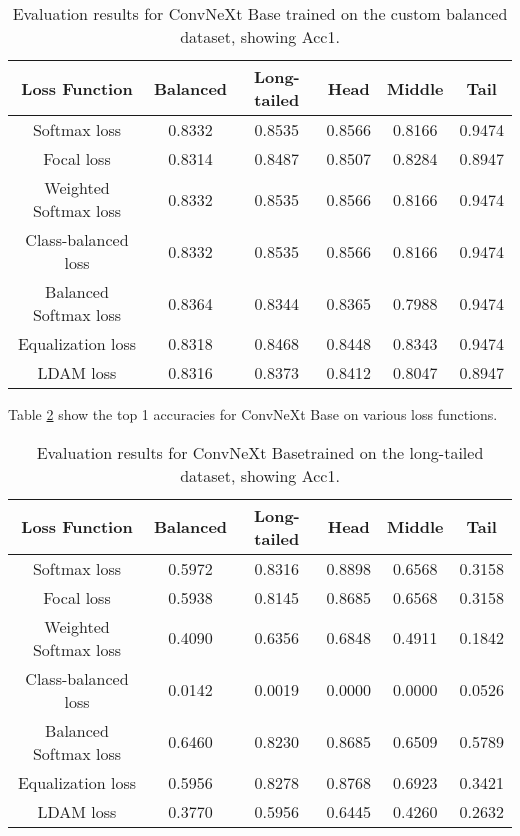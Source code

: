 \begin{table}[h!]
    \centering
    \begin{tabular}{cccccc}
        \toprule
        Loss Function & Balanced & Long-tailed & Head & Middle & Tail \\ 
        \midrule
        Softmax loss   & 0.8332 & 0.8535 & 0.8566 & 0.8166 & 0.9474 \\
        Focal loss   & 0.8314 & 0.8487 & 0.8507 & 0.8284 & 0.8947 \\
        Weighted Softmax loss   & 0.8332 & 0.8535 & 0.8566 &  0.8166 & 0.9474 \\
        Class-balanced loss   & 0.8332 & 0.8535 & 0.8566 & 0.8166 & 0.9474 \\
        Balanced Softmax loss   & 0.8364 & 0.8344 & 0.8365 & 0.7988 & 0.9474 \\
        Equalization loss   & 0.8318 & 0.8468 & 0.8448 & 0.8343 & 0.9474 \\
        LDAM loss   & 0.8316 & 0.8373 & 0.8412 & 0.8047 & 0.8947 \\
        \bottomrule
    \end{tabular}
    \caption{Evaluation results for ConvNeXt Base trained on the custom balanced dataset, showing Acc1.}
    \label{tab:conv_bal_acc1_1}
\end{table}

Table \ref{tab:conv_lt_acc1_1} show the top 1 accuracies for ConvNeXt Base on various loss functions.

\begin{table}[h!]
    \centering
    \begin{tabular}{cccccc}
        \toprule
        Loss Function & Balanced & Long-tailed & Head & Middle & Tail \\ 
        \midrule
        Softmax loss   & 0.5972 & 0.8316 & 0.8898 & 0.6568 & 0.3158 \\
        Focal loss   & 0.5938 & 0.8145 & 0.8685 & 0.6568 & 0.3158 \\
        Weighted Softmax loss   & 0.4090 & 0.6356 & 0.6848 & 0.4911 & 0.1842 \\
        Class-balanced loss   & 0.0142 & 0.0019 & 0.0000 & 0.0000 & 0.0526 \\
        Balanced Softmax loss   & 0.6460 & 0.8230 & 0.8685 & 0.6509 & 0.5789 \\
        Equalization loss   & 0.5956 & 0.8278 & 0.8768 & 0.6923 & 0.3421 \\
        LDAM loss   & 0.3770 & 0.5956 & 0.6445 & 0.4260 & 0.2632 \\
        \bottomrule
    \end{tabular}
    \caption{Evaluation results for ConvNeXt Basetrained on the long-tailed dataset, showing Acc1.}
    \label{tab:conv_lt_acc1_1}
\end{table}

